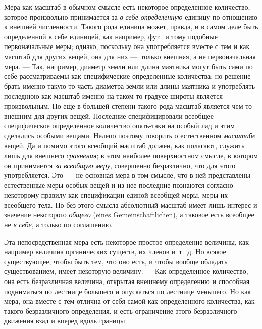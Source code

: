 Мера как масштаб в обычном смысле есть некоторое определенное количество,
которое произвольно принимается за {\em в себе
определенную} единицу по отношению к внешней численности. Такого рода
единица может, правда, и в самом деле быть определенной в себе единицей,
как например,
{фут}~\textstyleEndnodeLink{(\ref{bkm:Ref474666577}}\label{bkm:bm60}\textstyleEndnodeLink{)}
и тому подобные первоначальные меры; однако, поскольку она употребляется
вместе с тем и как масштаб для других вещей, она для них —~только внешняя,
а не первоначальная мера. — Так, например, диаметр земли или длина маятника
могут быть сами по себе рассматриваемы как специфические определенные
количества; но решение брать именно такую-то часть диаметра земли или длины
маятника и употреблять последнюю как масштаб именно на таком-то градусе
широты является произвольным. Но еще в большей степени такого рода масштаб
является чем-то внешним для других вещей. Последние специфицировали
всеобщее специфическое определенное количество опять-таки на особый лад и
этим сделались особыми вещами. Нелепо поэтому говорить о естественном
{\em масштабе} вещей. Да и помимо этого всеобщий
масштаб должен, как полагают, служить лишь для внешнего
{\em сравнения}; в этом наиболее поверхностном смысле,
в котором он принимается {\em за всеобщую меру},
совершенно безразлично, что для этого употребляется. Это —~не основная мера
в том смысле, что в ней представлены естественные меры особых вещей и из
нее последние познаются согласно некоторому правилу как спецификации единой
всеобщей меры, меры их всеобщего тела. Но без этого смысла абсолютный
масштаб имеет лишь интерес и значение некоторого
{\em общего} (eines Gemeinschaftlichen), а таковое есть
всеобщее не {\em в себе}, а только по соглашению.

Эта непосредственная мера есть некоторое простое определение величины, как
например величина органических существ, их членов и~т.~д. Но всякое
существующее, чтобы быть тем, что оно есть, и чтобы вообще обладать
существованием, имеет некоторую величину. — Как определенное количество,
она есть безразличная величина, открытая внешнему определению и способная
подниматься по лестнице большего и опускаться по лестнице меньшего. Но как
мера, она вместе с тем отлична от себя самой как определенного количества,
как такого безразличного определения, и есть ограничение этого
безразличного движения взад и вперед вдоль границы.

